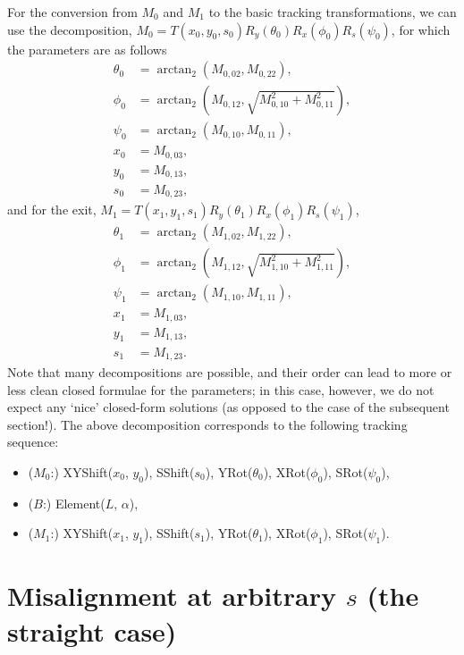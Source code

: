 For the conversion from $M_0$ and $M_1$ to the basic tracking transformations, we can use the decomposition, $M_0 = T(x_0, y_0, s_0) R_y(\theta_0) R_x(\phi_0) R_s(\psi_0)$, for which the parameters are as follows
\[
	\begin{aligned}
		\theta_0 &= \arctan_2(M_{0,02}, M_{0,22}), \\
		\phi_0 &= \arctan_2(M_{0,12}, \sqrt{M_{0,10}^2 + M_{0,11}^2}), \\
		\psi_0 &= \arctan_2(M_{0,10}, M_{0,11}), \\
		x_0 &= M_{0,03}, \\
		y_0 &= M_{0,13}, \\
		s_0 &= M_{0,23},
	\end{aligned}
\]
and for the exit, $M_1 = T(x_1, y_1, s_1) R_y(\theta_1) R_x(\phi_1) R_s(\psi_1)$,
\[
	\begin{aligned}
		\theta_1 &= \arctan_2(M_{1,02}, M_{1,22}), \\
		\phi_1 &= \arctan_2(M_{1,12}, \sqrt{M_{1,10}^2 + M_{1,11}^2}), \\
		\psi_1 &= \arctan_2(M_{1,10}, M_{1,11}), \\
		x_1 &= M_{1,03}, \\
		y_1 &= M_{1,13}, \\
		s_1 &= M_{1,23}.
	\end{aligned}
\]
Note that many decompositions are possible, and their order can lead to more or less clean closed formulae for the parameters; in this case, however, we do not expect any `nice' closed-form solutions (as opposed to the case of the subsequent section!).
The above decomposition corresponds to the following tracking sequence:
\begin{itemize}
	\item ($M_0$:) XYShift($x_0$, $y_0$), SShift($s_0$), YRot($\theta_0$), XRot($\phi_0$), SRot($\psi_0$),
	\item ($B$:) Element($L$, $\alpha$),
	\item ($M_1$:) XYShift($x_1$, $y_1$), SShift($s_1$), YRot($\theta_1$), XRot($\phi_1$), SRot($\psi_1$).
\end{itemize}


\section{Misalignment at arbitrary $s$ (the straight case)}\label{section:straight}


